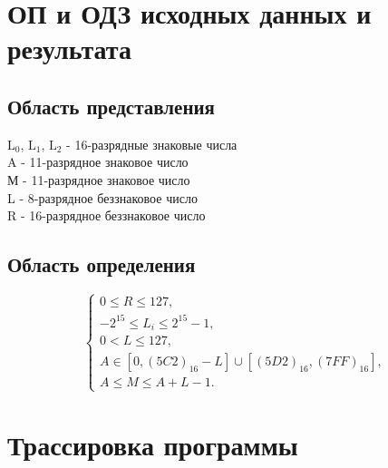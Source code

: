 \section{ОП и ОДЗ исходных данных и результата}
\subsection{Область представления}
$\text{L}_{0}$, $\text{L}_{1}$, $\text{L}_{2}$ - 16-разрядные знаковые числа \\
A - 11-разрядное знаковое число \\
М - 11-разрядное знаковое число \\
L - 8-разрядное беззнаковое число \\
R - 16-разрядное беззнаковое число \\

\subsection{Область определения}
\[
\begin{cases}
    0 \leq R \leq 127, \\
    -2^{15} \leq L_i \leq 2^{15} - 1, \\
    0 < L \leq 127, \\
    A \in [0, (5C2)_{16} - L] \cup [(5D2)_{16}, (7FF)_{16}], \\
    A \leq M \leq A + L - 1.
\end{cases}
\]

\section{Трассировка программы}

